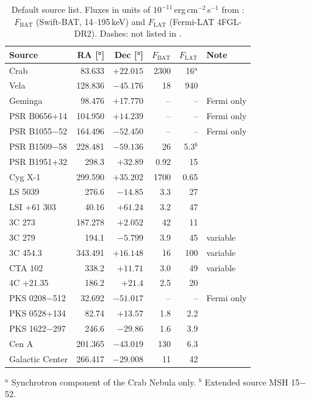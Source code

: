 \documentclass[a4paper,fleqn]{cas-sc}
\newif\ifshowtodos
\newcommand{\todo}[1]{\ifshowtodos{\color{red!70!black}\textbf{[TODO:} #1\textbf{]}}\fi}
\begin{document}
\begin{table}[ht]
\centering
\caption{Default source list. Fluxes in units of
$10^{-11}$\,erg\,cm$^{-2}$\,s$^{-1}$ from \citet{Tsuji2021}: $F_{\mathrm{BAT}}$
(Swift-BAT, 14--195\,keV) and $F_{\mathrm{LAT}}$ (Fermi-LAT 4FGL-DR2). Dashes:
not listed in \citet{Tsuji2021}. \todo{Add yearly time in view for zenith and
alternative pointings, computed with the web tool.}}
\label{tab:sources}
\small
\begin{tabular}{lrrrrl}
\toprule
Source & RA [\si{\degree}] & Dec [\si{\degree}] & $F_{\mathrm{BAT}}$ & $F_{\mathrm{LAT}}$ & Note \\
\midrule
Crab            &  83.633 & $+22.015$ & 2300 & 16$^{a}$ & \\
Vela            & 128.836 & $-45.176$ & 18   & 940  & \\
Geminga         &  98.476 & $+17.770$ & --   & --   & Fermi only \\
PSR B0656+14    & 104.950 & $+14.239$ & --   & --   & Fermi only \\
PSR B1055$-$52  & 164.496 & $-52.450$ & --   & --   & Fermi only \\
PSR B1509$-$58  & 228.481 & $-59.136$ & 26   & 5.3$^{b}$ & \\
PSR B1951+32    & 298.3   & $+32.89$  & 0.92 & 15   & \\
Cyg X-1         & 299.590 & $+35.202$ & 1700 & 0.65 & \\
LS 5039         & 276.6   & $-14.85$  & 3.3  & 27   & \\
LSI +61 303     &  40.16  & $+61.24$  & 3.2  & 47   & \\
3C 273          & 187.278 & $+2.052$  & 42   & 11   & \\
3C 279          & 194.1   & $-5.799$  & 3.9  & 45   & variable \\
3C 454.3        & 343.491 & $+16.148$ & 16   & 100  & variable \\
CTA 102         & 338.2   & $+11.71$  & 3.0  & 49   & variable \\
4C +21.35       & 186.2   & $+21.4$   & 2.5  & 20   & \\
PKS 0208$-$512  &  32.692 & $-51.017$ & --   & --   & Fermi only \\
PKS 0528+134    &  82.74  & $+13.57$  & 1.8  & 2.2  & \\
PKS 1622$-$297  & 246.6   & $-29.86$  & 1.6  & 3.9  & \\
Cen A           & 201.365 & $-43.019$ & 130  & 6.3  & \\
Galactic Center & 266.417 & $-29.008$ & 11   & 42   & \\
\bottomrule
\end{tabular}

\vspace{2pt}
{\footnotesize $^{a}$ Synchrotron component of the Crab Nebula only.
$^{b}$ Extended source MSH 15$-$52.
\todo{Verify the four Fermi-only positions against SIMBAD.}}
\end{table}
\end{document}
